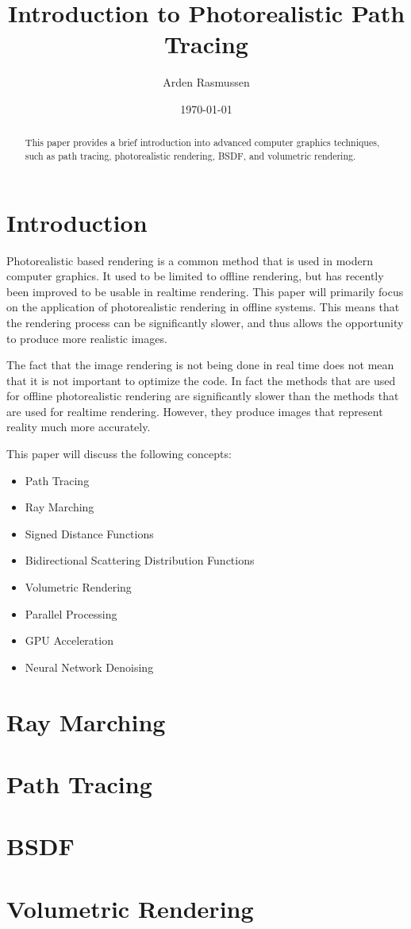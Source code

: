 \documentclass[10pt]{amsart}
\title{Introduction to Photorealistic Path Tracing}
\author{Arden Rasmussen}
\date{\today}
\begin{document}
\begin{abstract}
    This paper provides a brief introduction into advanced computer graphics
    techniques, such as path tracing, photorealistic rendering, BSDF, and
    volumetric rendering.
\end{abstract}

\maketitle

\section{Introduction}\label{sec:introduction}

Photorealistic based rendering is a common method that is used in modern
computer graphics. It used to be limited to offline rendering, but has recently
been improved to be usable in realtime rendering. This paper will primarily
focus on the application of photorealistic rendering in offline systems. This
means that the rendering process can be significantly slower, and thus allows
the opportunity to produce more realistic images.

The fact that the image rendering is not being done in real time does not mean
that it is not important to optimize the code. In fact the methods that are
used for offline photorealistic rendering are significantly slower than the
methods that are used for realtime rendering. However, they produce images that
represent reality much more accurately.

This paper will discuss the following concepts:
\begin{itemize}
    \item Path Tracing
    \item Ray Marching
    \item Signed Distance Functions
    \item Bidirectional Scattering Distribution Functions
    \item Volumetric Rendering
    \item Parallel Processing
    \item GPU Acceleration
    \item Neural Network Denoising
\end{itemize}

\section{Ray Marching}\label{sec:ray_marching}
\section{Path Tracing}\label{sec:path_tracing}
\section{BSDF}\label{sec:bsdf}
\section{Volumetric Rendering}\label{sec:volumetric_rendering}
\end{document}
